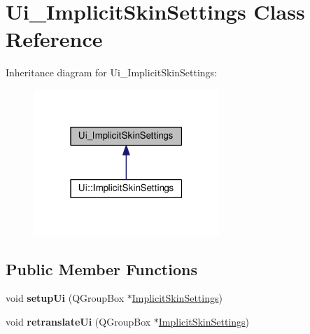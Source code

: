 \hypertarget{classUi__ImplicitSkinSettings}{}\section{Ui\+\_\+\+Implicit\+Skin\+Settings Class Reference}
\label{classUi__ImplicitSkinSettings}


Inheritance diagram for Ui\+\_\+\+Implicit\+Skin\+Settings\+:
\nopagebreak
\begin{figure}[H]
\begin{center}
\leavevmode
\includegraphics[width=199pt]{d7/dd1/classUi__ImplicitSkinSettings__inherit__graph}
\end{center}
\end{figure}
\subsection*{Public Member Functions}
\begin{DoxyCompactItemize}
\item 
void {\bfseries setup\+Ui} (Q\+Group\+Box $\ast$\hyperlink{classImplicitSkinSettings}{Implicit\+Skin\+Settings})\hypertarget{classUi__ImplicitSkinSettings_abd744cc1ab6638b4b585ab8f6022e214}{}\label{classUi__ImplicitSkinSettings_abd744cc1ab6638b4b585ab8f6022e214}

\item 
void {\bfseries retranslate\+Ui} (Q\+Group\+Box $\ast$\hyperlink{classImplicitSkinSettings}{Implicit\+Skin\+Settings})\hypertarget{classUi__ImplicitSkinSettings_a8d5805215a1a2d44443b20b796af7e6b}{}\label{classUi__ImplicitSkinSettings_a8d5805215a1a2d44443b20b796af7e6b}

\end{DoxyCompactItemize}

